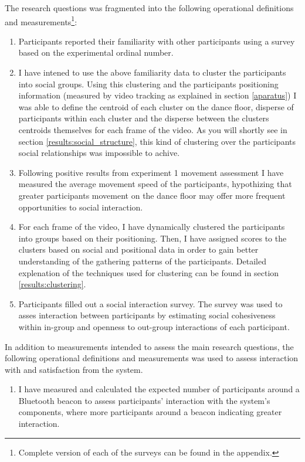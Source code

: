 \documentclass[a4paper,11pt]{article}
\begin{document}
{The research questions was fragmented into the following operational definitions and measurements\footnote{Complete version of each of the surveys can be found in the appendix.}:
\begin{enumerate}
	\item \label{measure:survey:familiarity} Participants reported their familiarity with other participants using a survey based on the experimental ordinal number.
	\item I have intened to use the above familiarity data to cluster the participants into social groups.
            Using this clustering and the participants positioning information (measured by video tracking as explained in section \ref{aparatus}) I was able to define the centroid of each cluster on the dance floor, disperse of participants within each cluster and the disperse between the clusters centroids themselves for each frame of the video.
            As you will shortly see in section \ref{results:social_structure}, this kind of clustering over the participants social relationships was impossible to achive.
        \item \label{measure:movement} Following positive results from experiment 1 movement assessment I have measured the average movement speed of the participants, hypothizing that greater participants movement on the dance floor may offer more frequent opportunities to social interaction.
        \item \label{measure:clustering} For each frame of the video, I have dynamically clustered the participants into groups based on their positioning.
            Then, I have assigned scores to the clusters based on social and positional data in order to gain better understanding of the gathering patterns of the participants.
            Detailed explenation of the techniques used for clustering can be found in section \ref{results:clustering}. 
	\item \label{measure:survey:social} Participants filled out a social interaction survey.
	The survey was used to asses interaction between participants by estimating social cohesiveness within in-group and openness to out-group interactions of each participant.
\end{enumerate}
In addition to measurements intended to assess the main research questions, the following operational definitions and measurements was used to assess interaction with and satisfaction from the system.
\begin{enumerate}[resume]
	\item \label{measure:system} I have measured and calculated the expected number of participants around a Bluetooth beacon to assess participants' interaction with the system's components, where more participants around a beacon indicating greater interaction.

\end{enumerate}}
\end{document}
